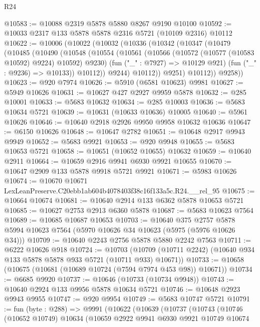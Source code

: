 \begin{lexlean}{R24}
\begin{coremodule}
@10583 := @10088 @2319 @5878 @5880 @8267 @9190 @10100
@10592 := @10033 @2317 @133 @5878 @5878 @2316 @5721 (@10109 @2316) @10112
@10622 := @10006
    (@10022
      (@10032
        (@10336
          (@10342
            (@10347
              (@10479
                (@10485
                  (@10490
                    (@10548
                      (@10554
                        (@10561
                          (@10566 (@10572 (@10577 (@10583 @10592) @9224) @10592) @9230)
                          (fun ("_" : @7927) => @10129 @921)
                          (fun ("_" : @9236) => @10133))
                        @10112))
                    @9244)
                  @10112))
              @9251)
            @10112))
        @9258))
@10623 := @920 @7974
@10626 := @5910 (@6581 @10623) @9981
@10627 := @5949 @10626
@10631 := @10627 @427 @2927 @9959 @5878
@10632 := @285 @10001
@10633 := @5683 @10632
@10634 := @285 @10003
@10636 := @5683 @10634 @5721
@10639 := @10631 (@10633 @10636) @10005
@10640 := @5961 @10626
@10646 := @10640 @2918 @2926 @9950 @9958 @10632 @10636
@10647 := @6150 @10626
@10648 := @10647 @2782
@10651 := @10648 @2917 @9943 @9949
@10652 := @5683 @9921
@10653 := @920 @9948
@10655 := @5683 @10653 @5721
@10658 := @10651 (@10652 @10655) @10632
@10659 := @10640 @2911
@10664 := @10659 @2916 @9941 @6930 @9921 @10655
@10670 := @10647 @2909 @133 @5878 @9918 @5721 @9921
@10671 := @5983 @10626
@10674 := @10670 @10671 LexLeanPreserve.C20ebb1ab604b4078403f38c16f133a5c.R24.__rel_95
@10675 := @10664 @10674
@10681 := @10640 @2914 @133 @6362 @5878 @10653 @5721
@10685 := @10627 @2753 @2913 @6360 @5878
@10687 := @5683 @10623 @7564
@10689 := @10685 @10687 @10653
@10703 := @10640
    @375
    @2757
    @5878
    @5994
    @10623
    @7564
    (@5970 @10626 @34 @10623 (@5975 (@5976 @10626 @34)))
@10709 := @10640 @2243 @2756 @5878 @5880 @2242 @7563
@10711 := @6222 @10626 @918
@10724 := @10703
    (@10709 (@10711 @2242) (@10640 @934 @133 @5878 @5878 @933 @5721 (@10711 @933) @10671))
@10733 := @10658 (@10675 (@10681 (@10689 @10724 (@7594 @7974 @453 @98)) @10671))
@10734 := @6685 @9920
@10737 := @10646 (@10733 (@10734 @9948))
@10743 := @10640 @2924 @133 @9956 @5878 @10634 @5721
@10746 := @10648 @2923 @9943 @9955
@10747 := @920 @9954
@10749 := @5683 @10747 @5721
@10791 := fun (byte : @288) =>
  @9991
    (@10622
      (@10639
        (@10737
          (@10743
            (@10746
              (@10652 @10749)
              @10634
              (@10659
                @2922
                @9941
                @6930
                @9921
                @10749
                @10674

\end{coremodule}
\end{lexlean}
